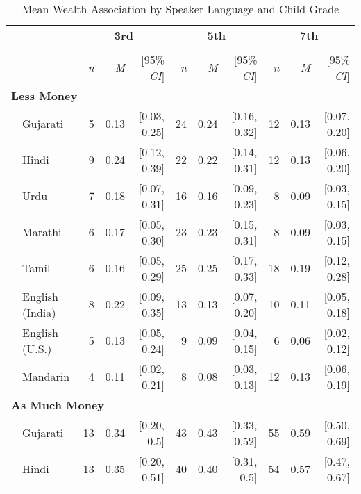 \begin{table}[t]
\centering
\caption{Mean Wealth Association by Speaker Language and Child Grade}\\
\begin{footnotesize}
\label{tab:wealth-means}
\begin{tabular}{p{.1in}lrrrrrrrrr}
\toprule
 &  & \multicolumn{3}{c}{\textbf{3rd}} & \multicolumn{3}{c}{\textbf{5th}} & \multicolumn{3}{c}{\textbf{7th}} \\
\cline{3-5} \cline{6-8} \cline{9-11}\\[-.75em]
&  & \textit{n} & \textit{M} & [95\% \textit{CI}] &  \textit{n} & \textit{M} & [95\% \textit{CI}] &  \textit{n}  & \textit{M} & [95\% \textit{CI}]\\
\midrule
\multicolumn{11}{l}{\textbf{Less Money}}\\
 & Gujarati & 5 & 0.13 & [0.03, 0.25] & 24 & 0.24 & [0.16, 0.32] & 12 & 0.13 & [0.07, 0.20]\\

 & Hindi & 9 & 0.24 & [0.12, 0.39] & 22 & 0.22 & [0.14, 0.31] & 12 & 0.13 & [0.06, 0.20]\\

 & Urdu & 7 & 0.18 & [0.07, 0.31] & 16 & 0.16 & [0.09, 0.23] & 8 & 0.09 & [0.03, 0.15]\\

 & Marathi & 6 & 0.17 & [0.05, 0.30] & 23 & 0.23 & [0.15, 0.31] & 8 & 0.09 & [0.03, 0.15]\\

 & Tamil & 6 & 0.16 & [0.05, 0.29] & 25 & 0.25 & [0.17, 0.33] & 18 & 0.19 & [0.12, 0.28]\\

 & English (India) & 8 & 0.22 & [0.09, 0.35] & 13 & 0.13 & [0.07, 0.20] & 10 & 0.11 & [0.05, 0.18]\\

 & English (U.S.) & 5 & 0.13 & [0.05, 0.24] & 9 & 0.09 & [0.04, 0.15] & 6 & 0.06 & [0.02, 0.12]\\

& Mandarin & 4 & 0.11 & [0.02, 0.21] & 8 & 0.08 & [0.03, 0.13] & 12 & 0.13 & [0.06, 0.19]\\
\midrule
\multicolumn{11}{l}{\textbf{As Much Money}}\\
 & Gujarati & 13 & 0.34 & [0.20, 0.5] & 43 & 0.43 & [0.33, 0.52] & 55 & 0.59 & [0.50, 0.69]\\

 & Hindi & 13 & 0.35 & [0.20, 0.51] & 40 & 0.40 & [0.31, 0.5] & 54 & 0.57 & [0.47, 0.67]\\


\end{tabular}
\end{footnotesize}
\end{table}
